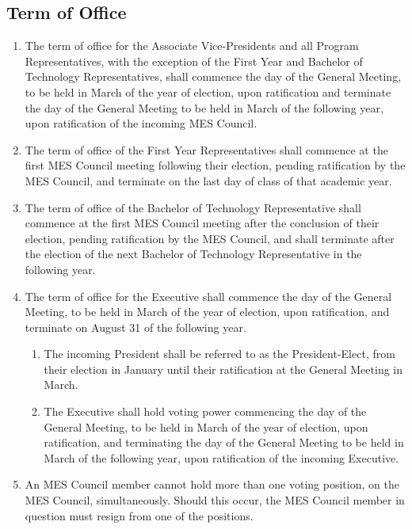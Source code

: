 \subsection{Term of Office}
\label{term-of-office}
\begin{enumerate}
 \item
  The term of office for the Associate Vice-Presidents and all Program Representatives, with the exception of the First Year and Bachelor of Technology Representatives, shall commence the day of the General Meeting, to be held in March of the year of election, upon ratification and terminate the day of the General Meeting to be held in March of the following year, upon ratification of the incoming MES Council.
 \item
  The term of office of the First Year Representatives shall commence at the first MES Council meeting following their election, pending ratification by the MES Council, and terminate on the last day of class of that academic year.
 \item
  The term of office of the Bachelor of Technology Representative shall commence at the first MES Council meeting after the conclusion of their election, pending ratification by the MES Council, and shall terminate after the election of the next Bachelor of Technology Representative in the following year.
 \item
  The term of office for the Executive shall commence the day of the General Meeting, to be held in March of the year of election, upon ratification, and terminate on August 31 of the following year.
  \begin{enumerate}
   \item
    The incoming President shall be referred to as the President-Elect, from their election in January until their ratification at the General Meeting in March.
   \item
    The Executive shall hold voting power commencing the day of the General Meeting, to be held in March of the year of election, upon ratification, and terminating the day of the General Meeting to be held in March of the following year, upon ratification of the incoming Executive.
  \end{enumerate}

 \item
  An MES Council member cannot hold more than one voting position, on the MES Council, simultaneously. Should this occur, the MES Council member in question must resign from one of the positions.

\end{enumerate}
